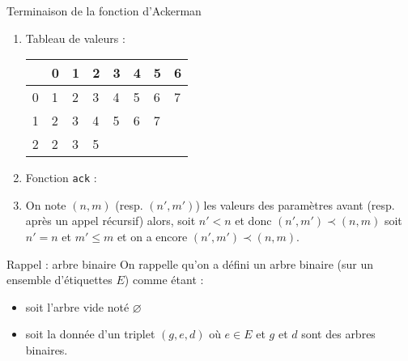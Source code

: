 \documentclass[10pt]{beamer}
\begin{document}
\begin{frame}[fragile]{\Ctitle}{\stitle}
	\begin{exampleblock}{Terminaison de la fonction d'Ackerman}
		\begin{enumerate}
			\item<2-> Tableau de valeurs :\\
				\begin{tabular}{|l|l|l|l|l|l|l|l|}
					\hline
					& 0     & 1     & 2     & 3        & 4        & 5        & 6        \\
					\hline
					0                       & 1 & 2 & 3 & 4    & 5    & 6    & 7    \\
					\hline
					1                       & 2 & 3 & 4 & 5    & 6    & 7    & \multicolumn{1}{c}{} \\
					\cline{1-7}
					2                       & 2 & 3 & 5 & \multicolumn{4}{c}{} \\
					\cline{1-4}
				\end{tabular}
			\item<3-> Fonction {\tt ack} :
			\item<4-> On note $(n,m)$ (resp. $(n',m')$) les valeurs des paramètres avant (resp. après un appel récursif) alors, soit $n' <n$ et donc $(n',m') \prec (n,m)$ soit $n'=n$ et $m' \leq m$ et on a encore $(n',m') \prec (n,m)$.
		\end{enumerate}
	\end{exampleblock}
\end{frame}

\begin{frame}[fragile]{\Ctitle}{\stitle}
    \begin{block}{Rappel : arbre binaire}
        On rappelle qu'on a défini un arbre binaire (sur un ensemble d'étiquettes $E$) comme étant :
        \begin{itemize}
            \item soit l'arbre vide noté $\varnothing$
            \item soit la donnée d'un triplet $(g, e, d)$ où $e \in E$ et $g$ et $d$ sont des arbres binaires.
        \end{itemize}
    \end{block}
\end{frame}
\end{document}
